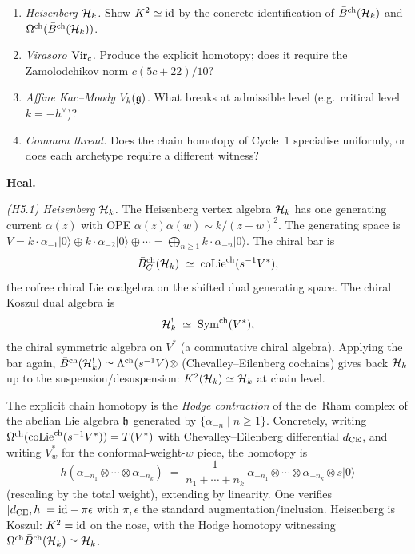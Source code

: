 \begin{enumerate}
\item[Q5.1] \emph{Heisenberg $\mathcal{H}_{k}$.} Show $K^{2}\simeq\mathrm{id}$ by
the concrete identification of $\bar{B}^{\mathrm{ch}}(\mathcal{H}_{k})$ and
$\Omega^{\mathrm{ch}}(\bar{B}^{\mathrm{ch}}(\mathcal{H}_{k}))$.
\item[Q5.2] \emph{Virasoro $\mathrm{Vir}_c$.} Produce the explicit homotopy;
does it require the Zamolodchikov norm $c(5c+22)/10$?
\item[Q5.3] \emph{Affine Kac--Moody $V_{k}(\mathfrak{g})$.} What breaks at
admissible level (e.g.\ critical level $k = -h^{\vee}$)?
\item[Q5.4] \emph{Common thread.} Does the chain homotopy of
Cycle~1 specialise uniformly, or does each archetype require a
different witness?
\end{enumerate}

\medskip
\textbf{Heal.}

\emph{(H5.1) Heisenberg $\mathcal{H}_{k}$.} The Heisenberg vertex algebra
$\mathcal{H}_{k}$ has one generating current $\alpha(z)$ with OPE
$\alpha(z)\alpha(w)\sim k/(z-w)^{2}$. The generating space is
$V = k\cdot\alpha_{-1}|0\rangle\oplus k\cdot\alpha_{-2}|0\rangle
\oplus\cdots = \bigoplus_{n\geq 1}k\cdot\alpha_{-n}|0\rangle$.
The chiral bar is
\[
\bar{B}^{\mathrm{ch}}_C(\mathcal{H}_{k}) \;\simeq\; \mathrm{coLie}^{\mathrm{ch}}(s^{-1}V^{*}),
\]
the cofree chiral Lie coalgebra on the shifted dual generating
space. The chiral Koszul dual algebra is
\[
\mathcal{H}_{k}^{!} \;\simeq\; \mathrm{Sym}^{\mathrm{ch}}(V^{*}),
\]
the chiral symmetric algebra on $V^{*}$ (a commutative chiral
algebra). Applying the bar again,
$\bar{B}^{\mathrm{ch}}(\mathcal{H}_{k}^{!}) \simeq \Lambda^{\mathrm{ch}}(s^{-1}V) \otimes$
(Chevalley--Eilenberg cochains) gives back $\mathcal{H}_{k}$ up to the
suspension/desuspension: $K^{2}(\mathcal{H}_{k}) \simeq \mathcal{H}_{k}$ at
chain level.

The explicit chain homotopy is the \emph{Hodge contraction} of the
de~Rham complex of the abelian Lie algebra $\mathfrak{h}$ generated by
$\{\alpha_{-n}\mid n\geq 1\}$. Concretely, writing
$\Omega^{\mathrm{ch}}(\mathrm{coLie}^{\mathrm{ch}}(s^{-1}V^{*})) = T(V^{*})$ with Chevalley--Eilenberg
differential $d_{\mathrm{CE}}$, and writing $V^{*}_{w}$ for the
conformal-weight-$w$ piece, the homotopy is
\[
h(\alpha_{-n_{1}}\otimes\cdots\otimes\alpha_{-n_{k}})
\;=\;
\frac{1}{n_{1}+\cdots+n_{k}}\,
\alpha_{-n_{1}}\otimes\cdots\otimes\alpha_{-n_{k}}\otimes s|0\rangle
\]
(rescaling by the total weight), extending by linearity. One verifies
$[d_{\mathrm{CE}},h] = \mathrm{id} - \pi\epsilon$ with $\pi,\epsilon$ the standard
augmentation/inclusion. Heisenberg is Koszul: $K^{2}=\mathrm{id}$ on the
nose, with the Hodge homotopy witnessing
$\Omega^{\mathrm{ch}}\bar{B}^{\mathrm{ch}}(\mathcal{H}_{k})\simeq\mathcal{H}_{k}$.

